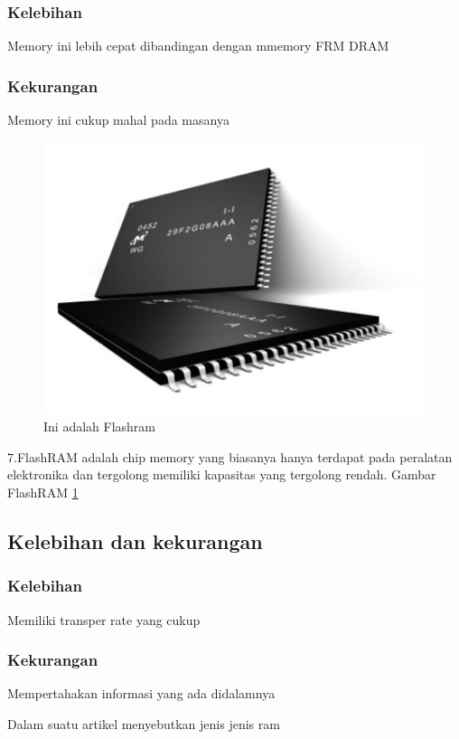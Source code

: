     \subsubsection{Kelebihan}
    \-Memory ini lebih cepat dibandingan dengan mmemory FRM DRAM
    \subsubsection{Kekurangan}
    \-Memory ini cukup mahal pada masanya


  \begin{figure}[ht]
  \centerline{\includegraphics[width=1\textwidth]{figures/Flashram.jpg}}
  \caption{Ini adalah Flashram}
  \label{Flashram}
  \end{figure}

7.FlashRAM adalah chip memory yang biasanya hanya terdapat pada peralatan elektronika dan tergolong memiliki kapasitas yang tergolong rendah.
Gambar FlashRAM \ref{Flashram}
  \subsection{Kelebihan dan kekurangan}
    \subsubsection{Kelebihan}
    \-Memiliki transper rate yang cukup
    \subsubsection{Kekurangan}
    \-Mempertahakan informasi yang ada didalamnya

Dalam suatu artikel menyebutkan jenis \- jenis ram \cite{bruce1999unified}

